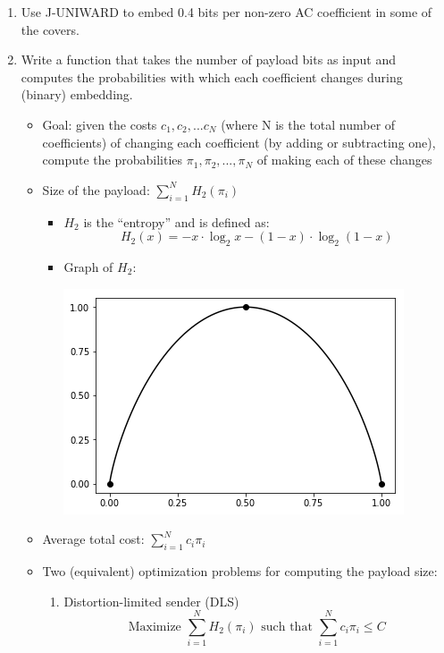 \documentclass[11pt,a4paper]{report}
\begin{document}
\begin{itemize}
\begin{enumerate}
  \item Use J-UNIWARD to embed 0.4 bits per non-zero AC coefficient in some of the covers.

  \item Write a function that takes the number of payload bits as input and computes the probabilities with which each coefficient changes during (binary) embedding.
    \begin{itemize}
    \item Goal: given the costs $c_1, c_2, ... c_N$ (where N is the total number of coefficients) of changing each coefficient (by adding or subtracting one), compute the probabilities $\pi_1, \pi_2, ..., \pi_N$ of making each of these changes

    \item Size of the payload: $\sum\limits_{i=1}^N H_2(\pi_i)$
      \begin{itemize}
      \item $H_2$ is the ``entropy'' and is defined as:
        \begin{equation*}
        H_2(x) = -x \cdot \log_2 x - (1-x) \cdot \log_2 (1-x)
        \end{equation*}

      \item Graph of $H_2$:
        \begin{center}
          \includegraphics[width=0.7\linewidth]{h2_plot.png}
        \end{center}
      \end{itemize}

    \item Average total cost: $\sum\limits_{i=1}^N c_i \pi_i$

    \item Two (equivalent) optimization problems for computing the payload size:
      \begin{enumerate}
      \item Distortion-limited sender (DLS)
        \begin{equation*}
        \text{Maximize } \sum\limits_{i=1}^N H_2(\pi_i) \text{ such that } \sum\limits_{i=1}^N c_i \pi_i \leq C
        \end{equation*}


\end{enumerate}
\end{itemize}
\end{enumerate}
\end{itemize}
\end{document}
